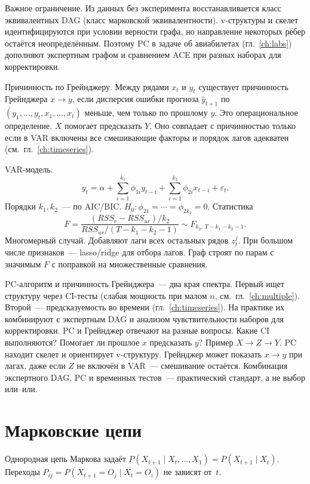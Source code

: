 Важное ограничение. Из данных без эксперимента восстанавливается класс эквивалентных DAG (класс марковской эквивалентности). v-структуры и скелет идентифицируются при условии верности графа, но направление некоторых рёбер остаётся неопределённым.
Поэтому PC в задаче об авиабилетах (гл.~\ref{ch:labs}) дополняют экспертным графом и сравнением ACE при разных наборах для корректировки.

Причинность по Грейнджеру. Между рядами $x_t$ и $y_t$ существует причинность Грейнджера $x\to y$, если дисперсия ошибки прогноза $\hat y_{t+1}$ по $(y_1,\ldots,y_t,x_1,\ldots,x_t)$ меньше, чем только по прошлому $y$.
Это операциональное определение. $X$ помогает предсказать $Y$. Оно совпадает с причинностью только если в VAR включены все смешивающие факторы и порядок лагов адекватен (см.~гл.~\ref{ch:timeseries}).

VAR-модель.\[ y_t = \alpha + \sum_{i=1}^{k_1}\phi_{1i} y_{t-i} + \sum_{i=1}^{k_2}\phi_{2i} x_{t-i} + \varepsilon_t.
\]
Порядки $k_1,k_2$~--- по AIC/BIC. $H_0\colon\phi_{21}=\cdots=\phi_{2k_2}=0$. Статистика
\[ F = \frac{(RSS_r-RSS_{ur})/k_2}{RSS_{ur}/(T-k_1-k_2-1)} \sim F_{k_2,\,T-k_1-k_2-1}.
\]
Многомерный случай. Добавляют лаги всех остальных рядов $z^j_t$. При большом числе признаков~--- lasso/ridge для отбора лагов.
Граф строят по парам с значимым $F$ с поправкой на множественные сравнения.

PC-алгоритм и причинность Грейнджера~--- два края спектра. Первый ищет структуру через CI-тесты (слабая мощность при малом $n$, см.~гл.~\ref{ch:multiple}). Второй~--- предсказуемость во времени (гл.~\ref{ch:timeseries}).
На практике их комбинируют с экспертным DAG и анализом чувствительности наборов для корректировки.
PC и Грейнджер отвечают на разные вопросы. Какие CI выполняются? Помогает ли прошлое $x$ предсказать $y$?
Пример $X\to Z\to Y$. PC находит скелет и ориентирует v-структуру. Грейнджер может показать $x\to y$ при лагах, даже если $Z$ не включён в VAR~--- смешивание остаётся.
Комбинация экспертного DAG, PC и временных тестов~--- практический стандарт, а не выбор или--или.

\section{Марковские цепи}

\begin{definition}
Однородная цепь Маркова задаёт $P(X_{t+1}\mid X_t,\ldots,X_1)=P(X_{t+1}\mid X_t)$. Переходы $P_{ij}=P(X_{t+1}=O_j\mid X_t=O_i)$ не зависят от~$t$.
\end{definition}

